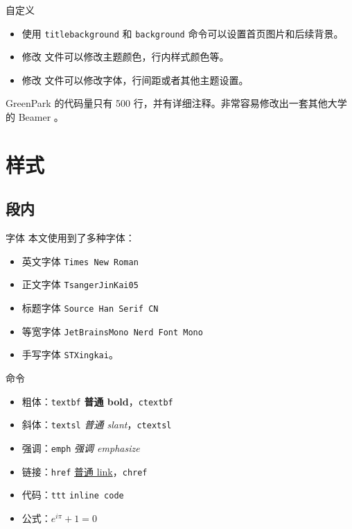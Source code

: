 \documentclass{ctexbeamer}
\begin{document}
\begin{frame}{自定义}
  \begin{itemize}
  \item 使用 \texttt{titlebackground} 和 \texttt{background}  命令可以设置首页图片和后续背景。
  \item 修改  文件可以修改主题颜色，行内样式颜色等。
  \item 修改  文件可以修改字体，行间距或者其他主题设置。
  \end{itemize}

  GreenPark 的代码量只有 500 行，并有详细注释。非常容易修改出一套其他大学的 Beamer 。
  
\end{frame}

\section{样式}
\subsection{段内}
\begin{frame}{字体}
  本文使用到了多种字体：
  \begin{itemize}
  \item 英文字体 \texttt{Times New Roman}
  \item 正文字体 \texttt{TsangerJinKai05}
  \item 标题字体 \texttt{Source Han Serif CN}
  \item 等宽字体 \texttt{JetBrainsMono Nerd Font Mono}
  \item 手写字体 \texttt{STXingkai}。
  \end{itemize}
\end{frame}

\begin{frame}{命令}
  \begin{itemize}
  \item 粗体：\texttt{textbf} \textbf{普通 bold}，\texttt{ctextbf} 
  \item 斜体：\texttt{textsl} \textsl{普通 slant}，\texttt{ctextsl} 
  \item 强调：\texttt{emph} \emph{强调 emphasize}
  \item 链接：\texttt{href} \href{https://thysrael.github.io/}{普通 link}，\texttt{chref} 
  \item 代码：\texttt{ttt} \texttt{inline code}
  \item 公式：\(e^{i\pi} + 1 = 0\)
  \end{itemize}
\end{frame}
\end{document}
